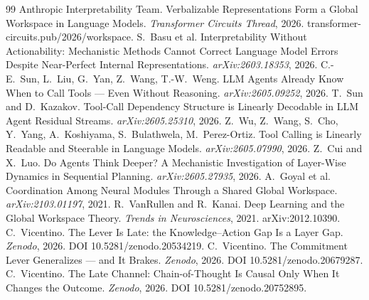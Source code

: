 \documentclass[11pt]{article}
\begin{document}
\small
\begin{thebibliography}{99}
 Anthropic Interpretability
Team. Verbalizable Representations Form a Global Workspace in Language Models. \emph{Transformer
Circuits Thread}, 2026. transformer-circuits.pub/2026/workspace.
 S.~Basu et al. Interpretability Without Actionability:
Mechanistic Methods Cannot Correct Language Model Errors Despite Near-Perfect Internal
Representations. \emph{arXiv:2603.18353}, 2026.
 C.-E.~Sun, L.~Liu, G.~Yan, Z.~Wang, T.-W.~Weng. LLM Agents
Already Know When to Call Tools --- Even Without Reasoning. \emph{arXiv:2605.09252}, 2026.
 T.~Sun and D.~Kazakov. Tool-Call Dependency Structure is
Linearly Decodable in LLM Agent Residual Streams. \emph{arXiv:2605.25310}, 2026.
 Z.~Wu, Z.~Wang, S.~Cho, Y.~Yang, A.~Koshiyama, S.~Bulathwela,
M.~Perez-Ortiz. Tool Calling is Linearly Readable and Steerable in Language Models.
\emph{arXiv:2605.07990}, 2026.
 Z.~Cui and X.~Luo. Do Agents Think Deeper? A Mechanistic
Investigation of Layer-Wise Dynamics in Sequential Planning. \emph{arXiv:2605.27935}, 2026.
 A.~Goyal et al. Coordination Among Neural Modules Through a
Shared Global Workspace. \emph{arXiv:2103.01197}, 2021.
 R.~VanRullen and R.~Kanai. Deep Learning and the
Global Workspace Theory. \emph{Trends in Neurosciences}, 2021. arXiv:2012.10390.
 C.~Vicentino. The Lever Is Late: the Knowledge--Action
Gap Is a Layer Gap. \emph{Zenodo}, 2026. DOI 10.5281/zenodo.20534219.
 C.~Vicentino. The Commitment Lever Generalizes --- and
It Brakes. \emph{Zenodo}, 2026. DOI 10.5281/zenodo.20679287.
 C.~Vicentino. The Late Channel: Chain-of-Thought Is
Causal Only When It Changes the Outcome. \emph{Zenodo}, 2026. DOI 10.5281/zenodo.20752895.
\end{thebibliography}
\end{document}
